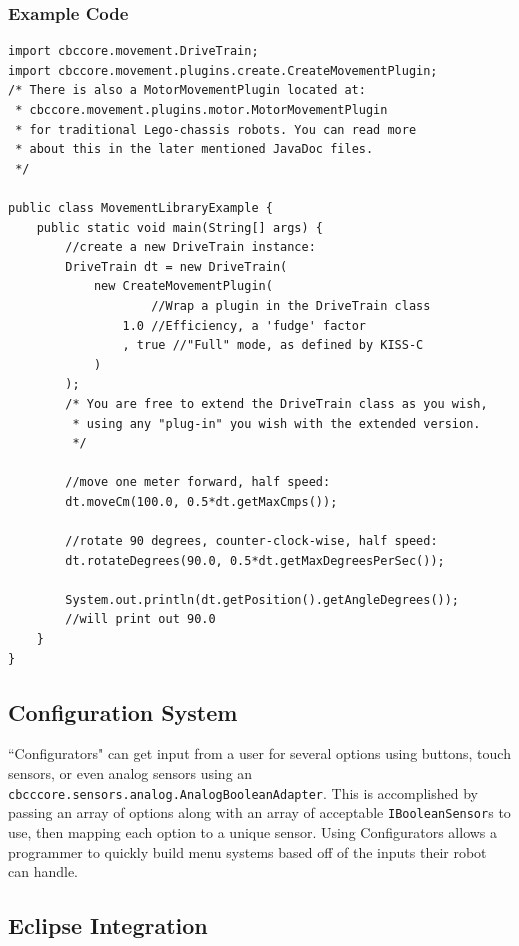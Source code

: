 \documentclass[12pt,letterpaper]{article}
\begin{document}
\subsubsection{Example Code}
\begin{verbatim}import cbccore.movement.DriveTrain;
import cbccore.movement.plugins.create.CreateMovementPlugin;
/* There is also a MotorMovementPlugin located at:
 * cbccore.movement.plugins.motor.MotorMovementPlugin
 * for traditional Lego-chassis robots. You can read more
 * about this in the later mentioned JavaDoc files.
 */

public class MovementLibraryExample {
    public static void main(String[] args) {
        //create a new DriveTrain instance:
        DriveTrain dt = new DriveTrain(
            new CreateMovementPlugin(
                    //Wrap a plugin in the DriveTrain class
                1.0 //Efficiency, a 'fudge' factor
                , true //"Full" mode, as defined by KISS-C
            )
        );
        /* You are free to extend the DriveTrain class as you wish,
         * using any "plug-in" you wish with the extended version.
         */
        
        //move one meter forward, half speed:
        dt.moveCm(100.0, 0.5*dt.getMaxCmps());
        
        //rotate 90 degrees, counter-clock-wise, half speed:
        dt.rotateDegrees(90.0, 0.5*dt.getMaxDegreesPerSec());
        
        System.out.println(dt.getPosition().getAngleDegrees());
        //will print out 90.0
    }
}
\end{verbatim}


\subsection{Configuration System}

``Configurators" can get input from a user for several options using buttons, touch sensors, or even analog sensors using an \texttt{cbcccore.\-sensors.\-analog.\-AnalogBooleanAdapter}. This is accomplished by passing an array of options along with an array of acceptable \texttt{IBooleanSensor}s to use, then mapping each option to a unique sensor. Using Configurators allows a programmer to quickly build menu systems based off of the inputs their robot can handle.



\subsection{Eclipse Integration}
\end{document}
